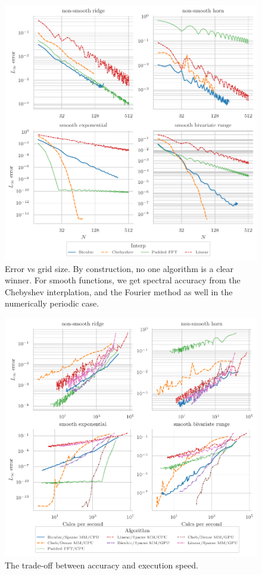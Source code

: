 	
	\begin{figure}[htbp!]
		\includegraphics[scale=1]{ConvergenceAllNew.pdf}	
		\caption[Gyroaveraging error vs grid size]{Error vs grid size.  By construction, no one algorithm is a clear winner.  For smooth functions, we get spectral accuracy from the Chebyshev interplation, and the Fourier method as well in the numerically periodic case.}  	\end{figure}

	\begin{figure}[htbp!]
	\includegraphics[scale=1]{OptimalAllNew.pdf}	
	\caption{The trade-off between accuracy and execution speed.}  	\end{figure}

